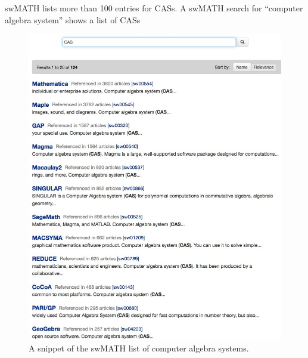 \documentclass[12pt]{article}
\begin{document}
swMATH lists more than 100 entries for CASs. A swMATH  search for ``computer algebra system'' shows a list of CASs
\begin{figure}[h]
  \centering
  \includegraphics[scale=0.2]{aca5}
  \caption{A snippet of the swMATH list of computer algebra systems.\label{abb_5}}
\end{figure}
\end{document}
